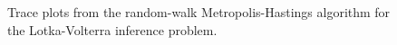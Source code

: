 \documentclass[11pt,a4paper]{report}
\begin{document}
\begin{figure}[h]
\centering
{}
\caption{Trace plots from the random-walk Metropolis-Hastings algorithm for the Lotka-Volterra inference problem.
\label{fig:lotka-volterra:trace-plots}}
\end{figure}
\end{document}
